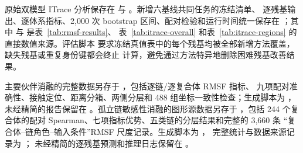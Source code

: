 原始双模型 ITrace 分析保存在 {\footnotesize{}} 与
{\footnotesize{}}。新增六基线共同任务的冻结清单、
逐残基输出、逐体系指标、2,000 次 bootstrap 区间、配对检验和运行时间统一保存在
{\footnotesize{}}；其中
{\footnotesize{}} 与
{\footnotesize{}} 是表~\ref{tab:rmsf-results}、
表~\ref{tab:itrace-overall} 和表~\ref{tab:itrace-regions} 的直接数值来源。评估脚本
要求冻结真值表中的每个残基均被全部新增方法覆盖，缺失残基或重复身份键都会终止
计算，避免通过方法特异地删除困难残基改善结果。

主要伙伴消融的完整数据另存于
{\footnotesize{}}，包括逐链/逐复合体 RMSF 指标、
九项配对准确性、接触定位、距离分箱、两侧分层和 488 组坐标一致性检查；生成脚本为
{\footnotesize{}}，未经精简的报告保留在
{\footnotesize{}}。孤立链敏感性消融的图形源数据另存于
{\footnotesize{}}，包括 244 个复合体的配对
Spearman、七项指标优势、五类链的分层结果和完整的 3,660 条
“复合体--链角色--输入条件”RMSF 尺度记录。生成脚本为
{\footnotesize{}}，
完整统计与数据来源记录为
{\footnotesize{}}；
未经精简的逐残基预测和推理日志保留在
{\footnotesize{}}。
